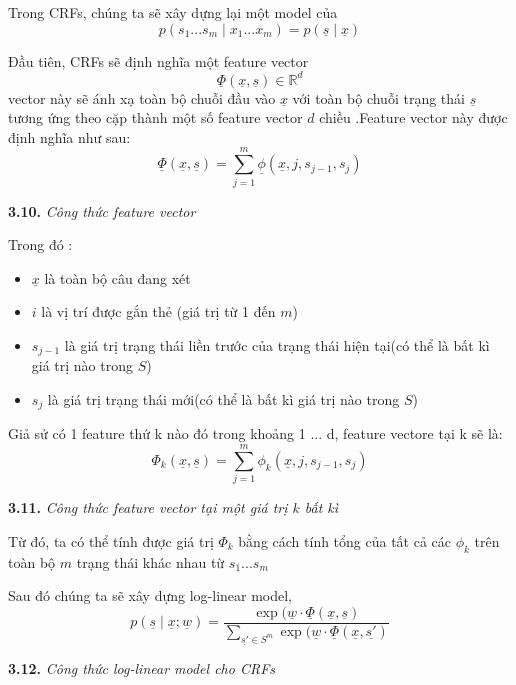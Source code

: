 Trong CRFs, chúng ta sẽ xây dựng lại một model của $$p(s_1 ... s_m\mid x_1 ... x_m) = p(\underline{s}\mid \underline{x})$$

Đầu tiên, CRFs sẽ định nghĩa một feature vector
$$ \underline{\Phi}(\underline{x},\underline{s}) \in \mathbb{R}^d$$
vector này sẽ ánh xạ toàn bộ chuỗi đầu vào $\underline{x}$ với toàn bộ chuỗi trạng thái $\underline{s}$ tương ứng theo cặp thành một số feature vector $d$ chiều .Feature vector này được định nghĩa như sau:
$$\underline{\Phi}(\underline{x},\underline{s}) = \sum_{j=1}^m \underline{\phi}(\underline{x},j,s_{j-1},s_j)$$
\begin{center}

\vspace{0.2cm}
\textbf{3.10.} \textit{Công thức feature vector}    
\end{center}
Trong đó :
\begin{itemize}
    \item $\underline{x}$ là toàn bộ câu đang xét
    \item $i$ là vị trí được gắn thẻ (giá trị từ 1 đến $m$)
    \item $s_{j-1}$ là giá trị trạng thái liền trước của trạng thái hiện tại(có thể là bất kì giá trị nào trong $S$)
    \item $s_j$ là giá trị trạng thái mới(có thể là bất kì giá trị nào trong $S$)
\end{itemize}

Giả sử có 1 feature thứ k nào đó trong khoảng 1 ... d, feature vectore tại k sẽ là:
$$\Phi_k(\underline{x},\underline{s}) = \sum_{j=1}^m \phi_k(\underline{x},j,s_{j-1},s_j)$$
\begin{center}

\vspace{0.1cm}
\textbf{3.11.} \textit{Công thức feature vector tại một giá trị $k$ bất kì}    
\end{center}
Từ đó, ta có thể tính được giá trị $\Phi_k$ bằng cách tính tổng của tất cả các $\phi_k$ trên toàn bộ $m$ trạng thái khác nhau từ $s_1...s_m$

Sau đó chúng ta sẽ xây dựng log-linear model,
$$p(\underline{s}\mid \underline{x};\underline{w}) = \frac{\exp (\underline{w} \cdot \underline{\Phi}(\underline{x},\underline{s})}{\sum_{\underline{s'}\in S^m } \exp (\underline{w} \cdot \underline{\Phi}(\underline{x},\underline{s'})}$$

\begin{center}

\vspace{0.1cm}
\textbf{3.12.} \textit{Công thức log-linear model cho CRFs}    
\end{center}

